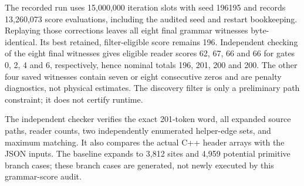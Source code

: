 The recorded run uses 15,000,000 iteration slots with seed 196195 and
records 13,260,073 score evaluations, including the audited seed and restart
bookkeeping. Replaying those corrections leaves all eight final grammar
witnesses byte-identical.
Its best retained, filter-eligible score remains 196. Independent checking
of the eight final witnesses gives eligible reader scores 62, 67, 66 and 66
for gates 0, 2, 4 and 6, respectively, hence nominal totals 196, 201, 200
and 200. The other four saved witnesses contain seven or eight consecutive
zeros and are penalty diagnostics, not physical estimates. The discovery
filter is only a preliminary path constraint; it does not certify runtime.

The independent checker verifies the exact 201-token word, all expanded
source paths, reader counts, two independently enumerated helper-edge sets,
and maximum matching. It also compares the actual C++ header arrays with
the JSON inputs. The baseline expands to 3,812 sites and 4,959 potential
primitive branch cases; these branch cases are generated, not newly
executed by this grammar-score audit.
